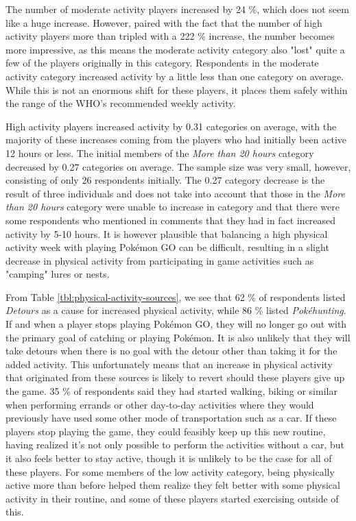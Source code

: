 The number of moderate activity players increased by 24 \%, which does not seem like a huge increase. However, paired with the fact that the number of high activity players more than tripled with a 222 \% increase, the number becomes more impressive, as this means the moderate activity category also "lost" quite a few of the players originally in this category. Respondents in the moderate activity category increased activity by a little less than one category on average. While this is not an enormous shift for these players, it places them safely within the range of the WHO's recommended weekly activity.

High activity players increased activity by 0.31 categories on average, with the majority of these increases coming from the players who had initially been active 12 hours or less. The initial members of the \emph{More than 20 hours} category decreased by 0.27 categories on average. The sample size was very small, however, consisting of only 26 respondents initially. The 0.27 category decrease is the result of three individuals and does not take into account that those in the \emph{More than 20 hours} category were unable to increase in category and that there were some respondents who mentioned in comments that they had in fact increased activity by 5-10 hours. It is however plausible that balancing a high physical activity week with playing Pokémon GO can be difficult, resulting in a slight decrease in physical activity from participating in game activities such as "camping" lures or nests. 


From Table \ref{tbl:physical-activity-sources}, we see that 62 \% of respondents listed \emph{Detours} as a cause for increased physical activity, while 86 \% listed \emph{Pokéhunting}. If and when a player stops playing Pokémon GO, they will no longer go out with the primary goal of catching or playing Pokémon. It is also unlikely that they will take detours when there is no goal with the detour other than taking it for the added activity. This unfortunately means that an increase in physical activity that originated from these sources is likely to revert should these players give up the game. 35 \% of respondents said they had started walking, biking  or similar when performing errands or other day-to-day activities where they would previously have used some other mode of transportation such as a car. If these players stop playing the game, they could feasibly keep up this new routine, having realized it's not only possible to perform the activities without a car, but it also feels better to stay active, though it is unlikely to be the case for all of these players. For some members of the low activity category, being physically active more than before helped them realize they felt better with some physical activity in their routine, and some of these players started exercising outside of this. 

